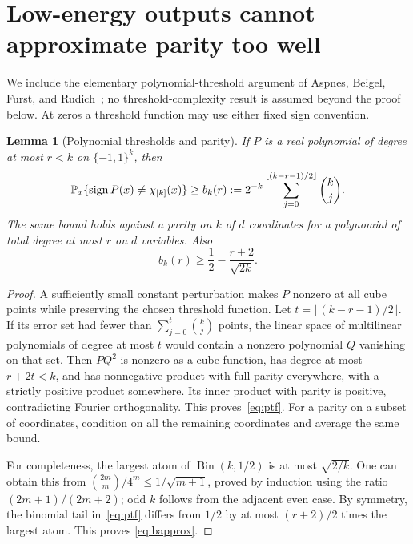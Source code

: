 \documentclass[11pt]{article}
\newtheorem{lemma}[theorem]{Lemma}
\theoremstyle{remark}\newtheorem{remark}[theorem]{Remark}
\DeclareMathOperator{\sign}{sign}\DeclareMathOperator{\Var}{Var}
\begin{document}
\section{Low-energy outputs cannot approximate parity too well}
We include the elementary polynomial-threshold argument of
Aspnes, Beigel, Furst, and Rudich~\cite{ABFR}; no threshold-complexity
result is assumed beyond the proof below. At zeros a threshold
function may use either fixed sign convention.

\begin{lemma}[Polynomial thresholds and parity]\label{lem:ptf}
If $P$ is a real polynomial of degree at most $r<k$ on
$\{-1,1\}^k$, then
\begin{equation}\label{eq:ptf}
 \Pp_x\{\sign P(x)\ne\chi_{[k]}(x)\}
 \ge b_k(r):=2^{-k}\sum_{j=0}^{\lfloor(k-r-1)/2\rfloor}\binom kj.
\end{equation}
The same bound holds against a parity on $k$ of $d$ coordinates
for a polynomial of total degree at most $r$ on $d$ variables.
Also
\begin{equation}\label{eq:bapprox}
 b_k(r)\ge\frac12-\frac{r+2}{\sqrt{2k}}.
\end{equation}
\end{lemma}

\begin{proof}
A sufficiently small constant perturbation makes $P$ nonzero at all
cube points while preserving the chosen threshold function. Let
$t=\lfloor(k-r-1)/2\rfloor$. If its error set had fewer than
$\sum_{j=0}^t\binom kj$ points, the linear space of multilinear
polynomials of degree at most $t$ would contain a nonzero polynomial
$Q$ vanishing on that set. Then $PQ^2$ is nonzero as a cube function,
has degree at most $r+2t<k$, and has nonnegative product with full
parity everywhere, with a strictly positive product somewhere.
Its inner product with parity is positive, contradicting Fourier
orthogonality. This proves~\eqref{eq:ptf}. For a parity on a subset
of coordinates, condition on all the remaining coordinates and
average the same bound.

For completeness, the largest atom of $\operatorname{Bin}(k,1/2)$
is at most $\sqrt{2/k}$. One can obtain this from
$\binom{2m}{m}/4^m\le1/\sqrt{m+1}$, proved by induction using the
ratio $(2m+1)/(2m+2)$; odd $k$ follows from the adjacent even case.
By symmetry, the binomial tail in~\eqref{eq:ptf} differs from
$1/2$ by at most $(r+2)/2$ times the largest atom. This proves
\eqref{eq:bapprox}.
\end{proof}
\end{document}
